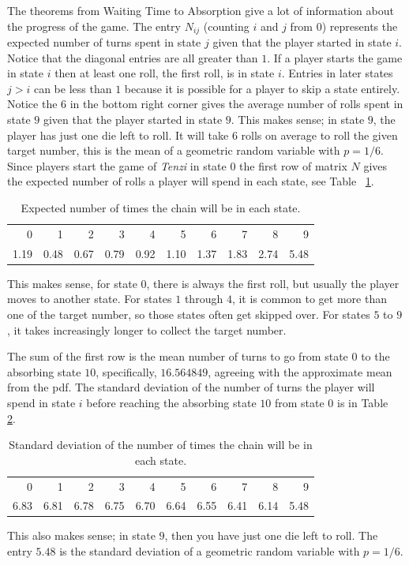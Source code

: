 \documentclass[12pt]{article}
\begin{document}
The theorems from 
{Waiting Time to Absorption} give a lot of information about the
progress of the game.  The entry \( N_ {ij} \) (counting \( i \) and \(
j \) from \( 0 \)) represents the expected number of turns spent in
state \( j \) given that the player started in state \( i \).  Notice
that the diagonal entries are all greater than \( 1 \).  If a player
starts the game in state \( i \) then at least one roll, the first roll,
is in state \( i \).  Entries in later states \( j>i \) can be less than
\( 1 \) because it is possible for a player to skip a state entirely.
Notice the \( 6 \) in the bottom right corner gives the average number
of rolls spent in state \( 9 \) given that the player started in state \(
9 \).  This makes sense; in state \( 9 \), the player has just one die
left to roll.  It will take \( 6 \) rolls on average to roll the given
target number, this is the mean of a geometric random variable with \( p
= 1/6 \).  Since players start the game of \emph{Tenzi} in state \( 0 \)
the first row of matrix \( N \) gives the expected number of rolls a
player will spend in each state, see Table~%
\ref{tab:games:tenzimean}.
\begin{table}
    \centering
    \begin{tabular}{rrrrrrrrrr}
        0    & 1    & 2    & 3    & 4    & 5    & 6    & 7    & 8    & 9    \\ 
        1.19 & 0.48 & 0.67 & 0.79 & 0.92 & 1.10 & 1.37 & 1.83 & 2.74 & 5.48
    \end{tabular}
    \caption{Expected number of times the chain will be in each state.}%
    \label{tab:games:tenzimean}
\end{table}
This makes sense, for state \( 0 \), there is always the first roll, but
usually the player moves to another state.  For states \( 1 \) through \(
4 \), it is common to get more than one of the target number, so those
states often get skipped over.  For states \( 5 \) to \( 9 \), it takes
increasingly longer to collect the target number.

The sum of the first row is the mean number of turns to go from state \(
0 \) to the absorbing state \( 10 \), specifically, \( 16.564849 \),
agreeing with the approximate mean from the pdf.  The standard deviation
of the number of turns the player will spend in state \( i \) before
reaching the absorbing state \( 10 \) from state \( 0 \) is in Table~%
\ref{tab:games:tenzisd}.
\begin{table}
    \centering
    \begin{tabular}{rrrrrrrrrr}
        0    & 1    & 2    & 3    & 4    & 5    & 6    & 7    & 8    & 9    \\ 
        6.83 & 6.81 & 6.78 & 6.75 & 6.70 & 6.64 & 6.55 & 6.41 & 6.14 & 5.48
    \end{tabular}
    \caption{Standard deviation of the number of times the chain will be
    in each state.}%
    \label{tab:games:tenzisd}
\end{table}
This also makes sense; in state \( 9 \), then you have just one die left
to roll.  The entry \( 5.48 \) is the standard deviation of a geometric
random variable with \( p = 1/6 \).
\end{document}
